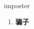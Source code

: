 
\begin{frame}
{\huge imposter}
\begin{center}
\begin{enumerate}\Large
  \item \textbf{骗子}
\end{enumerate}
\end{center}
\end{frame}
